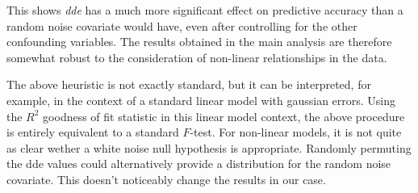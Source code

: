 \documentclass[10pt,]{article}
\begin{document}
This shows \emph{dde} has a much more significant effect on predictive
accuracy than a random noise covariate would have, even after
controlling for the other confounding variables. The results obtained in
the main analysis are therefore somewhat robust to the consideration of
non-linear relationships in the data.

The above heuristic is not exactly standard, but it can be interpreted,
for example, in the context of a standard linear model with gaussian
errors. Using the \(R^2\) goodness of fit statistic in this linear model
context, the above procedure is entirely equivalent to a standard
\(F\)-test. For non-linear models, it is not quite as clear wether a
white noise null hypothesis is appropriate. Randomly permuting the dde
values could alternatively provide a distribution for the random noise
covariate. This doesn't noticeably change the results in our case.





\newpage
\singlespacing 

\end{document}
